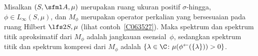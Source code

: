 \begin{exam} Misalkan $(S,\sfml A, \mu)$ merupakan ruang ukuran positif $\sigma$-hingga, $\phi \in L_\infty(S,\mu)$, dan $M_\phi$ merupakan
operator perkalian yang bersesuaian pada ruang Hilbert $\lfs2{S,\mu}$ (lihat contoh~\ref{C063527}). Maka
spektrum dan spektrum titik aproksimatif dari $M_\phi$ adalah jangkauan esensial~$\phi$, sedangkan spektrum titik
dan spektrum kompresi dari $M_\phi$ adalah $\{\lambda \in \C\colon \mu(\phi^{\gets}(\{\lambda\})) > 0\}$.
\end{exam}






















\endinput
